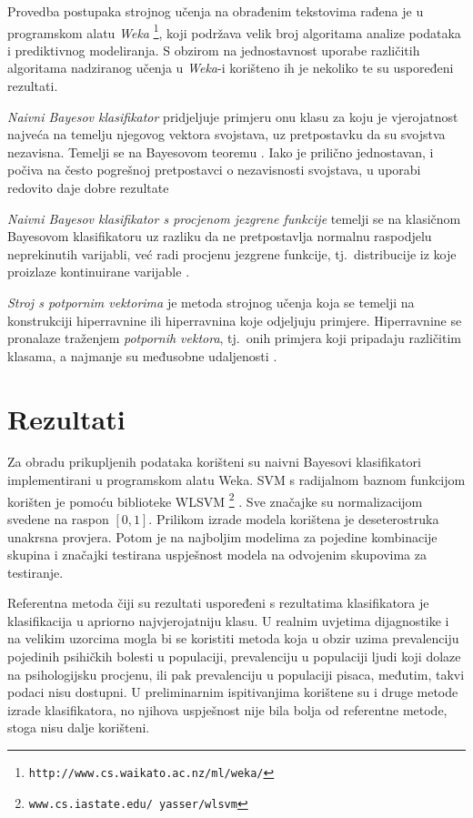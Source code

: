 \documentclass[10pt, a4paper]{article}
\begin{document}
Provedba postupaka strojnog učenja na obrađenim tekstovima rađena je u programskom alatu \emph{Weka} \footnote{\texttt{http://www.cs.waikato.ac.nz/ml/weka/}}, koji podržava velik broj algoritama analize podataka i prediktivnog modeliranja. S obzirom na jednostavnost uporabe različitih algoritama nadziranog učenja u \emph{Weka}-i korišteno ih je nekoliko te su uspoređeni rezultati.  

\emph{Naivni Bayesov klasifikator} pridjeljuje primjeru onu klasu za koju je vjerojatnost najveća na temelju njegovog vektora svojstava, uz pretpostavku da su svojstva nezavisna. Temelji se na Bayesovom teoremu \citep{bayes-63}. Iako je prilično jednostavan, i počiva na često pogrešnoj pretpostavci o nezavisnosti svojstava, u uporabi redovito daje dobre rezultate \citep{hand-yu}

\emph{Naivni Bayesov klasifikator s procjenom jezgrene funkcije} temelji se na klasičnom Bayesovom klasifikatoru uz razliku da ne pretpostavlja normalnu raspodjelu neprekinutih varijabli, već radi procjenu jezgrene funkcije, tj.~distribucije iz koje proizlaze kontinuirane varijable \citep{john-95}.

\emph{Stroj s potpornim vektorima}  je metoda strojnog učenja koja se temelji na konstrukciji hiperravnine ili hiperravnina koje odjeljuju primjere. Hiperravnine se pronalaze traženjem \emph{potpornih vektora}, tj.~onih primjera koji pripadaju različitim klasama, a najmanje su međusobne udaljenosti \citep{cortes-vap}.



\section{Rezultati}


 
Za obradu prikupljenih podataka korišteni su naivni Bayesovi klasifikatori implementirani u programskom alatu Weka. SVM s radijalnom baznom funkcijom korišten je pomoću biblioteke WLSVM \footnote{\texttt{www.cs.iastate.edu/~yasser/wlsvm}} \citep{yh05}. Sve značajke su normalizacijom svedene na raspon $[0,1]$. Prilikom izrade modela korištena je deseterostruka unakrsna provjera. Potom je na najboljim modelima za pojedine kombinacije skupina i značajki testirana uspješnost modela na odvojenim skupovima za testiranje.

Referentna metoda čiji su rezultati uspoređeni s rezultatima klasifikatora je klasifikacija u apriorno najvjerojatniju klasu. U realnim uvjetima dijagnostike i na velikim uzorcima mogla bi se koristiti metoda koja u obzir uzima prevalenciju pojedinih psihičkih bolesti u populaciji, prevalenciju u populaciji ljudi koji dolaze na psihologijsku procjenu, ili pak prevalenciju u populaciji pisaca, međutim, takvi podaci nisu dostupni. U preliminarnim ispitivanjima korištene su i druge metode izrade klasifikatora, no njihova uspješnost nije bila bolja od referentne metode, stoga nisu dalje korišteni.
\end{document}
